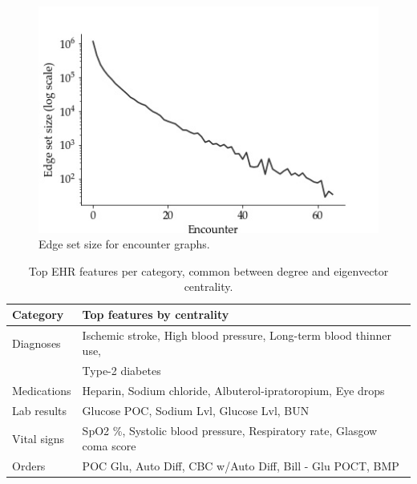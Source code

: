 \documentclass{article}
\begin{document}
\begin{figure}
    \centering
    \includegraphics[scale=0.5]{encntr_edges.jpg}
    \caption{Edge set size for encounter graphs.}
    \label{fig:edge_dist}
\end{figure}

\begin{table}
    \caption{
      Top EHR features per category, common between degree and eigenvector centrality.
    }
    \label{tab:exp}
    \centering
    \centering
    \label{tab:exp-synth}
    \begin{small}
    \begin{sc}
    \begin{tabular}{ll}
    \toprule
    Category                       & Top features by centrality \\
    \midrule
    Diagnoses                         & Ischemic stroke, High blood pressure, Long-term blood thinner use, \\ & Type-2 diabetes \\
    Medications                         & Heparin, Sodium chloride, Albuterol-ipratoropium, Eye drops\\
    Lab results                         & Glucose POC, Sodium Lvl, Glucose Lvl, BUN     \\
    Vital signs                            & SpO2 \%, Systolic blood pressure, Respiratory rate, Glasgow coma score     \\ 
    Orders                    & POC Glu, Auto Diff, CBC w/Auto Diff, Bill - Glu POCT, BMP \\
    \bottomrule
    \end{tabular}
    \end{sc}
    \end{small}
    \vskip -0.1in
\end{table}
\end{document}
